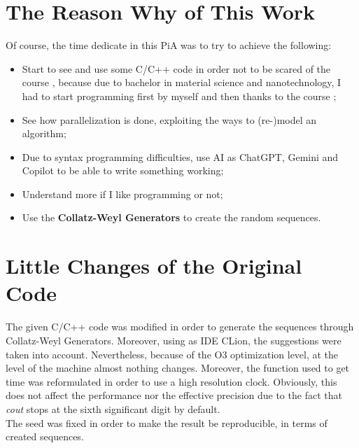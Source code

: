\documentclass[conference]{IEEEtran}
\begin{document}
    \section{The Reason Why of This Work}
    Of course, the time dedicate in this PiA was to try to achieve the following:
    \begin{itemize}
    	\item Start to see and use some C/C++ code in order not to be scared of the course \cite{polimi_data_mining}, because due to bachelor in material science and nanotechnology, I had to start programming first by myself and then thanks to the course \cite{polimi_machine_learning};
    	
    	\item See how parallelization is done, exploiting the ways to (re-)model an algorithm;
    	
    	\item Due to syntax programming difficulties, use AI as ChatGPT, Gemini and Copilot to be able to write something working;
    	
    	\item Understand more if I like programming or not;
    	
    	\item Use the \textbf{Collatz-Weyl Generators}\cite{działa2024collatzweylgeneratorshighquality} to create the random sequences.
    \end{itemize}
    
    \section{Little Changes of the Original Code}
    The given C/C++ code was modified in order to generate the sequences through Collatz-Weyl Generators. Moreover, using as IDE CLion, the suggestions were taken into account. Nevertheless, because of the O3 optimization level, at the level of the machine almost nothing changes. Moreover, the function used to get time was reformulated in order to use a high resolution clock. Obviously, this does not affect the performance nor the effective precision due to the fact that \textit{cout} stops at the sixth significant digit by default.\\
    The seed was fixed in order to make the result be reproducible, in terms of created sequences.
    
\end{document}
